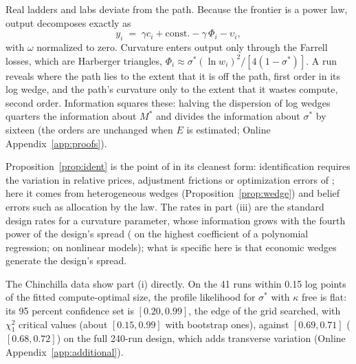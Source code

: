 Real ladders and labs deviate from the path. Because the frontier is a power law, output decomposes exactly as
\begin{equation}\label{eq:ident-decomp}
y_i \;=\; \gamma c_i+\mathrm{const.}-\gamma\,\Phi_i-\upsilon_i ,
\end{equation}
with $\omega$ normalized to zero. Curvature enters output only through the Farrell losses, which are Harberger triangles,
$\Phi_i\approx\sigma^*(\ln w_i)^2/[4(1-\sigma^*)]$. A run reveals where the path lies to the extent that it is off the
path, first order in its log wedge, and the path's curvature only to the extent that it wastes compute, second order. Information squares these: halving the dispersion of log wedges quarters the information about $M^*$ and
divides the information about $\sigma^*$ by sixteen (the orders are unchanged when $E$ is estimated; Online
Appendix~\ref{app:proofs}).

Proposition~\ref{prop:ident} is the point of \citet{marschak1944random} in its cleanest form: identification requires
the variation in relative prices, adjustment frictions or
optimization errors of \citet{bond2005adjustment} \citep[see also][]{gandhi2020identification}; here it
comes from heterogeneous wedges (Proposition~\ref{prop:wedge}) and belief errors such as allocation by the
\citet{kaplan2020scaling} law. The rates in part (iii) are the standard design rates for a curvature
parameter, whose information grows with the fourth power of the design's spread (\citealt{kiefer1959optimum} on the
highest coefficient of a polynomial regression; \citealt{box1959design} on nonlinear models); what is specific here is
that economic wedges generate the design's spread.

The Chinchilla data show part (i) directly. On the 41 runs within 0.15 log points of the fitted compute-optimal size, the
profile likelihood for $\sigma^*$ with $\kappa$ free is flat: its 95 percent confidence set is $[0.20,0.99]$, the edge of
the grid searched, with $\chi^2_1$ critical values (about $[0.15,0.99]$ with bootstrap ones), against $[0.69,0.71]$
($[0.68,0.72]$) on the full 240-run design, which adds transverse variation (Online Appendix~\ref{app:additional}).

